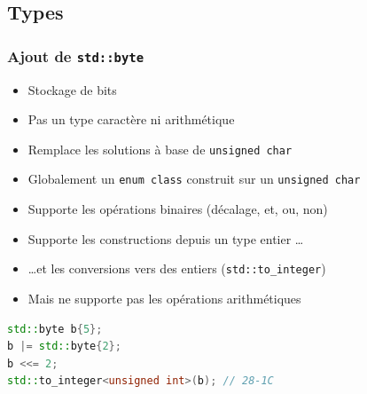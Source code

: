 \documentclass[C++.tex]{subfiles}
\begin{document}
\subsection*{Types}
\begin{frame}[fragile]
	\frametitle{Ajout de \lstinline|std::byte|}
	\begin{itemize}
		\item Stockage de bits
		\item Pas un type caractère ni \og arithmétique\fg{}
		\item Remplace les solutions à base de \lstinline|unsigned char|
		\item Globalement un \lstinline|enum class| construit sur un \lstinline|unsigned char|
		\item Supporte les opérations binaires (décalage, et, ou, non)
		\item Supporte les constructions depuis un type entier \ldots


		\item \ldots et les conversions vers des entiers (\lstinline|std::to_integer|)
		\item Mais ne supporte pas les opérations arithmétiques
	\end{itemize}

	\begin{lstlisting}[language=C++]
std::byte b{5};
b |= std::byte{2};
b <<= 2;
std::to_integer<unsigned int>(b); // 28-1C\end{lstlisting}
\end{frame}
\end{document}
